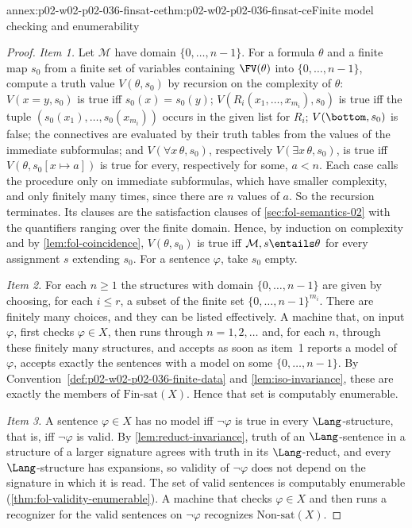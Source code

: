 \begin{annexitem}{annex:p02-w02-p02-036-finsat-ce}{thm:p02-w02-p02-036-finsat-ce}{Finite model checking and enumerability}
\begin{proof}
\emph{Item 1.}  Let \(\mathcal M\) have domain \(\{0,\ldots,n-1\}\).  For a
formula \(\theta\) and a finite map \(s_0\) from a finite set of variables
containing \(\FV(\theta)\) into \(\{0,\ldots,n-1\}\), compute a truth value
\(V(\theta,s_0)\) by recursion on the complexity of \(\theta\):
\(V(x=y,s_0)\) is true iff \(s_0(x)=s_0(y)\); \(V(R_i(x_1,\ldots,x_{m_i}),s_0)\)
is true iff the tuple \((s_0(x_1),\ldots,s_0(x_{m_i}))\) occurs in the given
list for \(R_i\); \(V(\bottom,s_0)\) is false; the connectives are evaluated by
their truth tables from the values of the immediate subformulas; and
\(V(\forall x\,\theta,s_0)\), respectively \(V(\exists x\,\theta,s_0)\), is true
iff \(V(\theta,s_0[x\mapsto a])\) is true for every, respectively for some,
\(a<n\).  Each case calls the procedure only on immediate subformulas, which
have smaller complexity, and only finitely many times, since there are \(n\)
values of \(a\).  So the recursion terminates.  Its clauses are the
satisfaction clauses of \cref{sec:fol-semantics-02} with the quantifiers
ranging over the finite domain.  Hence, by induction on complexity and by
\cref{lem:fol-coincidence}, \(V(\theta,s_0)\) is true iff
\(\mathcal M,s\entails\theta\) for every assignment \(s\) extending \(s_0\).
For a sentence \(\varphi\), take \(s_0\) empty.

\emph{Item 2.}  For each \(n\geq1\) the structures with domain
\(\{0,\ldots,n-1\}\) are given by choosing, for each \(i\leq r\), a subset of
the finite set \(\{0,\ldots,n-1\}^{m_i}\).  There are finitely many choices,
and they can be listed effectively.  A machine that, on input \(\varphi\),
first checks \(\varphi\in X\), then runs through \(n=1,2,\ldots\) and, for each
\(n\), through these finitely many structures, and accepts as soon as item~1
reports a model of \(\varphi\), accepts exactly the sentences with a model on
some \(\{0,\ldots,n-1\}\).  By
Convention~\ref{def:p02-w02-p02-036-finite-data} and \cref{lem:iso-invariance},
these are exactly the members of \(\mathrm{Fin\text{-}sat}(X)\).  Hence that set
is computably enumerable.

\emph{Item 3.}  A sentence \(\varphi\in X\) has no model iff \(\neg\varphi\)
is true in every \(\Lang\)-structure, that is, iff \(\neg\varphi\) is valid.
By \cref{lem:reduct-invariance}, truth of an \(\Lang\)-sentence in a
structure of a larger signature agrees with truth in its \(\Lang\)-reduct, and
every \(\Lang\)-structure has expansions, so validity of \(\neg\varphi\) does
not depend on the signature in which it is read.  The set of valid sentences is
computably enumerable (\cref{thm:fol-validity-enumerable}).  A machine that
checks \(\varphi\in X\) and then runs a recognizer for the valid sentences on
\(\neg\varphi\) recognizes \(\mathrm{Non\text{-}sat}(X)\).


\end{proof}
\end{annexitem}
